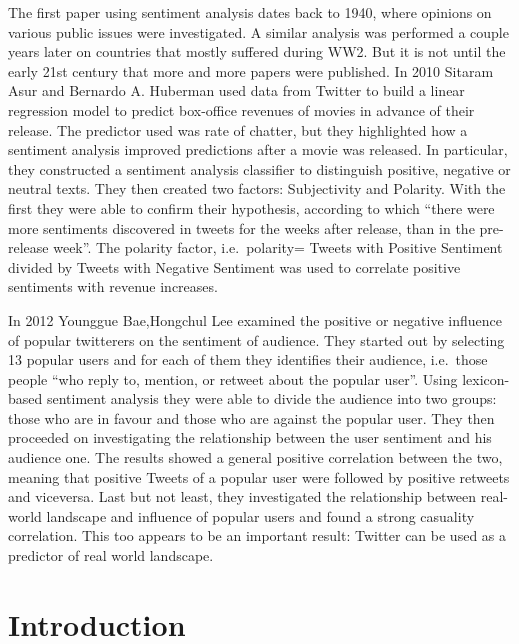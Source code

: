 \documentclass[
]{article}
\begin{document}
The first paper using sentiment analysis dates back to 1940, where
opinions on various public issues were investigated. A similar analysis
was performed a couple years later on countries that mostly suffered
during WW2. But it is not until the early 21st century that more and
more papers were published. In 2010 Sitaram Asur and Bernardo A.
Huberman used data from Twitter to build a linear regression model to
predict box-office revenues of movies in advance of their release. The
predictor used was rate of chatter, but they highlighted how a sentiment
analysis improved predictions after a movie was released. In particular,
they constructed a sentiment analysis classifier to distinguish
positive, negative or neutral texts. They then created two factors:
Subjectivity and Polarity. With the first they were able to confirm
their hypothesis, according to which ``there were more sentiments
discovered in tweets for the weeks after release, than in the
pre-release week''. The polarity factor, i.e.~polarity= Tweets with
Positive Sentiment divided by Tweets with Negative Sentiment was used to
correlate positive sentiments with revenue increases.

In 2012 Younggue Bae,Hongchul Lee examined the positive or negative
influence of popular twitterers on the sentiment of audience. They
started out by selecting 13 popular users and for each of them they
identifies their audience, i.e.~those people ``who reply to, mention, or
retweet about the popular
user''.\autocite{baeSentimentAnalysisTwitter2012a} Using lexicon-based
sentiment analysis they were able to divide the audience into two
groups: those who are in favour and those who are against the popular
user. They then proceeded on investigating the relationship between the
user sentiment and his audience one. The results showed a general
positive correlation between the two, meaning that positive Tweets of a
popular user were followed by positive retweets and viceversa. Last but
not least, they investigated the relationship between real-world
landscape and influence of popular users and found a strong casuality
correlation. This too appears to be an important result: Twitter can be
used as a predictor of real world landscape.

\hypertarget{introduction}{%
\section{Introduction}\label{introduction}}
\end{document}
